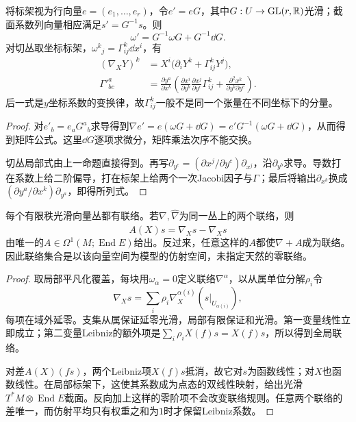 \begin{proposition}[换标架与坐标系数]\label{prop:connection-change}
将标架视为行向量$e=(e_1,\ldots,e_r)$，令$e'=eG$，其中$G:U\to\operatorname{GL}(r,\mathbb{R})$光滑；截面系数列向量相应满足$s'=G^{-1}s$。则
\[
 \omega'=G^{-1}\omega G+G^{-1}\dd G.
\]
对切丛取坐标标架，$\omega^k{}_j=\Gamma^k_{ij}\dd x^i$，有
\begin{align*}
 (\nabla_XY)^k&=X^i\bigl(\partial_iY^k+\Gamma^k_{ij}Y^j\bigr),\\
 \Gamma'^a_{bc}&=\frac{\partial y^a}{\partial x^k}
 \left(\frac{\partial x^i}{\partial y^b}\frac{\partial x^j}{\partial y^c}\Gamma^k_{ij}
       +\frac{\partial^2x^k}{\partial y^b\partial y^c}\right).
\end{align*}
后一式是$y$坐标系数的变换律，故$\Gamma^k_{ij}$一般不是同一个张量在不同坐标下的分量。
\end{proposition}
\begin{proof}
对$e'_b=e_aG^a{}_b$求导得到$\nabla e'=e(\omega G+\dd G)=e'G^{-1}(\omega G+\dd G)$，从而得到矩阵公式。这里$\dd G$逐项求微分，矩阵乘法次序不能交换。

切丛局部式由上一命题直接得到。再写$\partial_{y^c}=(\partial x^j/\partial y^c)\partial_{x^j}$，沿$\partial_{y^b}$求导。导数打在系数上给二阶偏导，打在标架上给两个一次Jacobi因子与$\Gamma$；最后将输出$\partial_{x^k}$换成$(\partial y^a/\partial x^k)\partial_{y^a}$，即得所列式。
\end{proof}

\begin{theorem}[联络的存在及其差]\label{thm:connection-affine}
每个有限秩光滑向量丛都有联络。若$\nabla,\widehat\nabla$为同一丛上的两个联络，则
\[
 A(X)s=\widehat\nabla_Xs-\nabla_Xs
\]
由唯一的$A\in\Omega^1(M;\operatorname{End}E)$给出。反过来，任意这样的$A$都使$\nabla+A$成为联络。因此联络集合是以该向量空间为模型的仿射空间，未指定天然的零联络。
\end{theorem}
\begin{proof}
取局部平凡化覆盖，每块用$\omega_\alpha=0$定义联络$\nabla^\alpha$，以从属单位分解$\rho_i$令
\[
 \nabla_Xs=\sum_i\rho_i\nabla^{\alpha(i)}_X(s|_{U_{\alpha(i)}}),
\]
每项在域外延零。支集从属保证延零光滑，局部有限保证和光滑。第一变量线性立即成立；第二变量Leibniz的额外项是$\sum_i\rho_i X(f)s=X(f)s$，所以得到全局联络。

对差$A(X)(fs)$，两个Leibniz项$X(f)s$抵消，故它对$s$为函数线性；对$X$也函数线性。在局部标架下，这使其系数成为点态的双线性映射，给出光滑$T^*M\otimes\operatorname{End}E$截面。反向加上这样的零阶项不会改变联络规则。任意两个联络的差唯一，而仿射平均只有权重之和为$1$时才保留Leibniz系数。
\end{proof}

